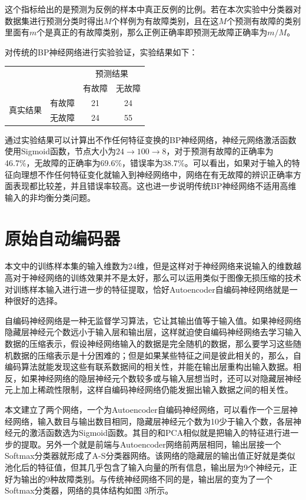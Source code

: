 \documentclass{ctacn}%
\begin{document}
\begin{multicols}{2}
这个指标给出的是预测为反例的样本中真正反例的比例。若在本次实验中分类器对数据集进行预测分类时得出$M$个样例为有故障类别，且在这$M$个预测有故障的类别里面有$m$个是真正的有故障类别，那么正例正确率即预测无故障正确率为$m/M$。

对传统的BP神经网络进行实验验证，实验结果如下：


\begin{center}
	\label{tab:3}
	\begin{tabular} {cccc}\toprule
		\multirow{2}{*}[-2pt]{}&\multirow{2}{*}[-2pt]{}&\multicolumn{2}{c}{预测结果}\\
		\cmidrule(lr){3-4}
		&&有故障&无故障\\\hline
		\multirow{2}{*}[-2pt]{真实结果}&有故障&21&24\\
		&无故障&24&55\\
		\bottomrule
\end{tabular}\end{center}

通过实验结果可以计算出不作任何特征变换的BP神经网络，神经元网络激活函数使用Sigmoid函数，节点大小为$24\rightarrow100\rightarrow8$，对于预测有故障的正确率为46.7\%，无故障的正确率为69.6\%，错误率为38.7\%。可以看出，如果对于输入的特征向理想不作任何特征变化就输入到神经网络中，网络在有无故障的辨识正确率方面表现都比较差，并且错误率较高。这也进一步说明传统BP神经网络不适用高维输入的非均衡分类问题。

\section{原始自动编码器}

本文中的训练样本集的输入维数为24维，但是这样对于神经网络来说输入的维数越高对于神经网络的训练效果并不是太好，那么可以运用类似于图像无损压缩的技术对训练样本输入进行进一步的特征提取，恰好Autoencoder自编码神经网络就是一种很好的选择。

自编码神经网络是一种无监督学习算法，它让其输出值等于输入值。如果神经网络隐藏层神经元个数远小于输入层和输出层，这样就迫使自编码神经网络去学习输入数据的压缩表示，假设神经网络输入的数据是完全随机的数据，那么要学习这些随机数据的压缩表示是十分困难的；但是如果某些特征之间是彼此相关的，那么，自编码算法就能发现这些有联系数据间的相关性，并能在输出层重构出输入数据。相反，如果神经网络的隐层神经元个数较多或与输入层想当时，还可以对隐藏层神经元上加上稀疏性限制，这样自编码神经网络仍能发掘出输入数据之间的相关性。

本文建立了两个网络，一个为Autoencoder自编码神经网络，可以看作一个三层神经网络，输入数目与输出数目相同，隐藏层神经元个数为10少于输入个数，各层神经元的激活函数选为Sigmoid函数。其目的和PCA相似就是把输入的特征进行进一步的提取。另外一个就是前端与Autoencoder网络前两层相同，输出层接一个Softmax分类器就形成了A-S分类器网络。该网络的隐藏层的输出值正好就是类似池化后的特征值，但其几乎包含了输入向量的所有信息，输出层为9个神经元，正好为输出的9种故障类别。与传统神经网络不同的是，输出层的变为了一个Softmax分类器，网络的具体结构如图
3所示。


\end{multicols}
\end{document}
